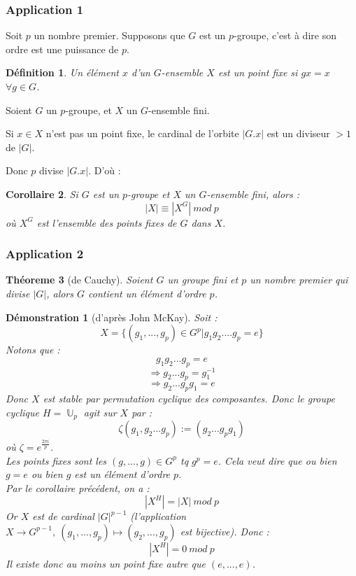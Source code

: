 \documentclass[a4paper, oneside]{report}
\theoremstyle{break}
\newtheorem{thm}{Théoreme}[section] %
\newtheorem{defi}[thm]{Définition}
\newtheorem{cor}[thm]{Corollaire}
\newtheorem*{demo}{Démonstration}
\DeclareMathOperator{\U}{\mathbb{U}}
\begin{document}
\subsubsection{Application 1}

Soit $p$ un nombre premier. Supposons que $G$ est un $p$-groupe, c'est à dire son ordre est une puissance de $p$.

\begin{defi}
	Un élément $x$ d'un $G$-ensemble $X$ est un point fixe si $gx=x$ $\forall g\in G$.
\end{defi}

Soient $G$ un $p$-groupe, et $X$ un $G$-ensemble fini.

Si $x\in X$ n'est pas un point fixe, le cardinal de l'orbite $|G.x|$ est un diviseur $>1$ de $|G|$.

Donc $p$ divise $|G.x|$. D'où :

\begin{cor}
	Si $G$ est un $p$-groupe et $X$ un $G$-ensemble fini, alors :
	$$|X| \equiv |X^G|~mod~p$$
	où $X^G$ est l'ensemble des points fixes de $G$ dans $X$.
\end{cor}

\subsubsection{Application 2}

\begin{thm}[de Cauchy]
	Soient $G$ un groupe fini et $p$ un nombre premier qui divise $|G|$, alors $G$ contient un élément d'ordre $p$.
\end{thm}

\begin{demo}[d'après John McKay]
	Soit :
	$$X=\{(g_1,...,g_p)\in G^p | g_1g_2....g_p =e \}$$
	Notons que :
	$$g_1g_2...g_p = e$$
	$$\Rightarrow g_2...g_p=g_1^{-1}$$
	$$\Rightarrow g_2...g_pg_1=e$$
	Donc $X$ est stable par permutation cyclique des composantes. Donc le groupe cyclique $H=\U_p$ agit sur $X$ par :
	$$\zeta(g_1,g_2...g_p) := (g_2...g_pg_1)$$
	où $\zeta = e^{\frac{2\pi i}{p}}$.\\
	Les points fixes sont les $(g,...,g)\in G^p$ tq $g^p=e$. Cela veut dire que ou bien $g=e$ ou bien $g$ est un élément d'ordre $p$.\\
	Par le corollaire précédent, on a :
	$$|X^H|=|X|~mod~p$$
	Or $X$ est de cardinal $|G|^{p-1}$ (l'application $X \rightarrow G^{p-1},~(g_1,...,g_p)\mapsto (g_2,...,g_p)$ est bijective). Donc :
	$$|X^H|=0~mod~p$$
	Il existe donc au moins un point fixe autre que $(e,...,e)$.	
\end{demo}
\end{document}
